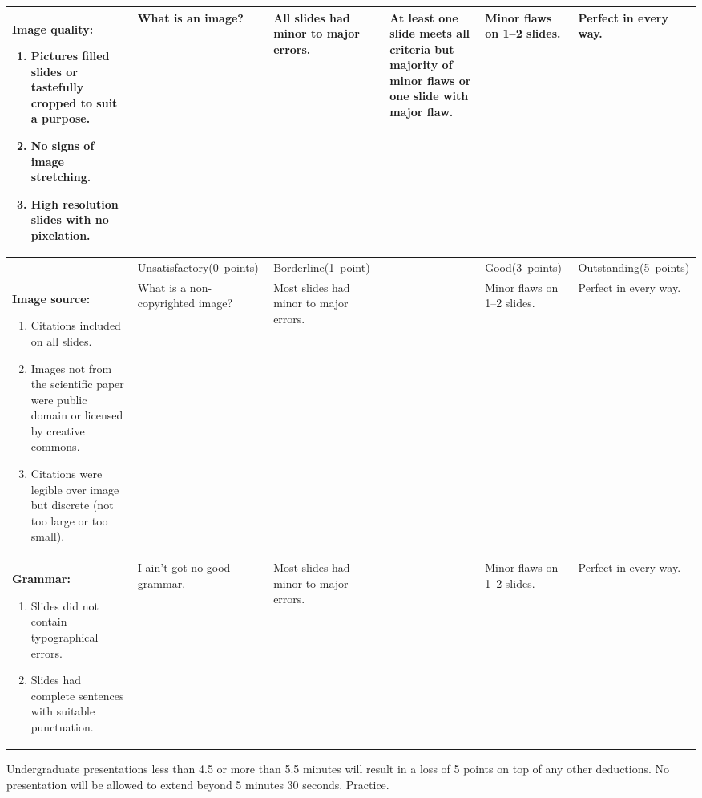 \documentclass[10pt]{article}
\begin{document}
\begin{landscape}
{\begin{longtable}[l]{@{}L{7cm}L{3cm}L{3cm}L{3cm}L{3cm}L{3cm}@{}}
\textbf{Image quality:}\par%
\vspace{-0.5\baselineskip}
\begin{enumerate}[itemsep=-0.25\baselineskip,align=left, leftmargin=*]
\item Pictures filled slides or tastefully cropped to suit a purpose.%
\item No signs of image stretching.%
\item High resolution slides with no pixelation.%
\end{enumerate}&%
What is an image? &%
All slides had minor to major errors. &%
At least one slide meets all criteria but majority of minor flaws or one slide with major flaw. &%
Minor flaws on 1–2 slides.&%
Perfect in every way.%
\\[-1em]
\midrule
	& Unsatisfactory\newline (0~points) & Borderline\newline (1~point) & & Good\newline (3~points) 	& Outstanding\newline (5~points) \\
\midrule
\textbf{Image source:}\par%
\vspace{-0.5\baselineskip}
\begin{enumerate}[itemsep=-0.25\baselineskip,align=left, leftmargin=*]
\item Citations included on all slides.%
\item Images not from the scientific paper were public domain or licensed by creative commons.%
\item Citations were legible over image but discrete (not too large or too small).%
\end{enumerate}&%
What is a non-copyrighted image? &%
Most slides had minor to major errors. &%
&
Minor flaws on 1–2 slides. &%
Perfect in every way. %
\\[-1em]
\midrule
\textbf{Grammar:}\par%
\vspace{-0.5\baselineskip}
\begin{enumerate}[itemsep=-0.25\baselineskip,align=left, leftmargin=*]
	\item Slides did not contain typographical errors.%
	\item Slides had complete sentences with suitable punctuation.%
\end{enumerate}&%
I ain't got no good grammar. &%
Most slides had minor to major errors. &%
&
Minor flaws on 1–2 slides. &%
Perfect in every way. %
\\[-1em]
\bottomrule
\end{longtable}
}%
Undergraduate presentations less than 4.5 or more than 5.5 minutes will result in a loss of 5 points on top of any other deductions. No presentation will be allowed to extend beyond 5 minutes 30 seconds. Practice.


\end{landscape}
\end{document}
